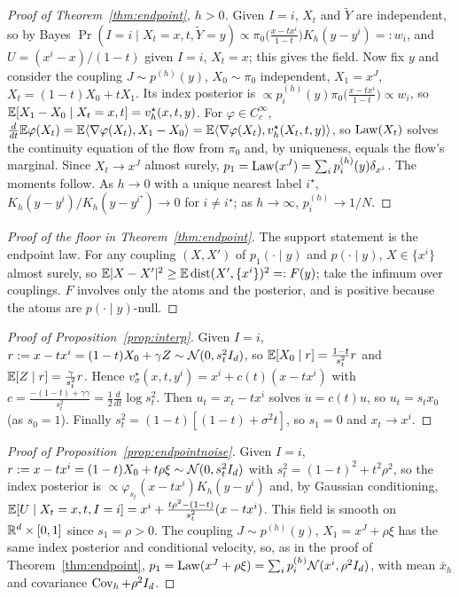 \documentclass{article}
\theoremstyle{plain}
\theoremstyle{remark}
\begin{document}
\begin{proof}[Proof of Theorem~\ref{thm:endpoint}, $h>0$]
Given $I=i$, $X_t$ and $\widetilde Y$ are independent, so by Bayes
$\Pr(I=i\mid X_t=x,t,\widetilde Y=y)\propto\pi_0\big(\tfrac{x-tx^i}{1-t}\big)K_h(y-y^i)=:w_i$,
and $U=(x^i-x)/(1-t)$ given $I=i$, $X_t=x$; this gives the field. Now fix $y$ and
consider the coupling $J\sim p^{(h)}(y)$, $X_0\sim\pi_0$ independent, $X_1=x^J$,
$X_t=(1-t)X_0+tX_1$. Its index posterior is
$\propto p_i^{(h)}(y)\pi_0\big(\tfrac{x-tx^i}{1-t}\big)\propto w_i$, so
$\mathbb{E}[X_1-X_0\mid X_t=x,t]=v_h^\star(x,t,y)$. For $\varphi\in C_c^\infty$,
$\frac{d}{dt}\mathbb{E}\varphi(X_t)=\mathbb{E}\langle\nabla\varphi(X_t),X_1-X_0\rangle
=\mathbb{E}\langle\nabla\varphi(X_t),v_h^\star(X_t,t,y)\rangle$, so $\mathrm{Law}(X_t)$ solves the
continuity equation of the flow from $\pi_0$ and, by uniqueness, equals the flow's
marginal. Since $X_t\to x^J$ almost surely, $p_1=\mathrm{Law}(x^J)=\sum_ip_i^{(h)}(y)\delta_{x^i}$.
The moments follow. As $h\to0$ with a unique nearest label $i^\star$,
$K_h(y-y^i)/K_h(y-y^{i^\star})\to0$ for $i\ne i^\star$; as $h\to\infty$,
$p_i^{(h)}\to1/N$.
\end{proof}

\begin{proof}[Proof of the floor in Theorem~\ref{thm:endpoint}]
The support statement is the endpoint law. For any coupling $(X,X')$ of
$p_1(\cdot\mid y)$ and $p(\cdot\mid y)$, $X\in\{x^i\}$ almost surely, so
$\mathbb{E}|X-X'|^2\ge\mathbb{E}\operatorname{dist}(X',\{x^i\})^2=:F(y)$; take the infimum over couplings. $F$
involves only the atoms and the posterior, and is positive because the atoms are
$p(\cdot\mid y)$-null.
\end{proof}

\begin{proof}[Proof of Proposition~\ref{prop:interp}]
Given $I=i$, $r:=x-tx^i=(1-t)X_0+\gamma Z\sim\mathcal{N}(0,s_t^2I_d)$, so
$\mathbb{E}[X_0\mid r]=\frac{1-t}{s_t^2}r$ and $\mathbb{E}[Z\mid r]=\frac{\gamma}{s_t^2}r$. Hence
$v^\star_\sigma(x,t,y^i)=x^i+c(t)(x-tx^i)$ with
$c=\frac{-(1-t)+\gamma\dot\gamma}{s_t^2}=\frac12\frac{d}{dt}\log s_t^2$. Then
$u_t=x_t-tx^i$ solves $\dot u=c(t)u$, so $u_t=s_tx_0$ (as $s_0=1$). Finally
$s_t^2=(1-t)[(1-t)+\sigma^2t]$, so $s_1=0$ and $x_t\to x^i$.
\end{proof}

\begin{proof}[Proof of Proposition~\ref{prop:endpointnoise}]
Given $I=i$, $r:=x-tx^i=(1-t)X_0+t\rho\xi\sim\mathcal{N}(0,s_t^2I_d)$ with
$s_t^2=(1-t)^2+t^2\rho^2$, so the index posterior is
$\propto\varphi_{s_t}(x-tx^i)K_h(y-y^i)$ and, by Gaussian conditioning,
$\mathbb{E}[U\mid X_t=x,t,I=i]=x^i+\frac{t\rho^2-(1-t)}{s_t^2}(x-tx^i)$. This field is smooth
on $\mathbb{R}^d\times[0,1]$ since $s_1=\rho>0$. The coupling $J\sim p^{(h)}(y)$,
$X_1=x^J+\rho\xi$ has the same index posterior and conditional velocity, so, as in the
proof of Theorem~\ref{thm:endpoint}, $p_1=\mathrm{Law}(x^J+\rho\xi)=\sum_ip_i^{(h)}\mathcal{N}(x^i,\rho^2I_d)$,
with mean $\bar x_h$ and covariance $\operatorname{Cov}_h+\rho^2I_d$.
\end{proof}
\end{document}
